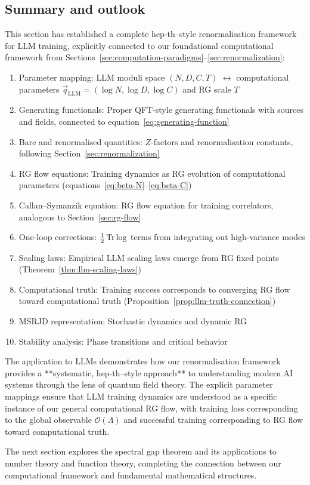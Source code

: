 \subsection{Summary and outlook}

This section has established a complete hep-th–style renormalisation framework for LLM training, explicitly connected to our foundational computational framework from Sections~\ref{sec:computation-paradigms}--\ref{sec:renormalization}:

\begin{enumerate}
\item Parameter mapping: LLM moduli space $(N,D,C,T)$ $\leftrightarrow$ computational parameters $\vec{q}_{\text{LLM}} = (\log N, \log D, \log C)$ and RG scale $T$
\item Generating functionals: Proper QFT-style generating functionals with sources and fields, connected to equation~\eqref{eq:generating-function}
\item Bare and renormalised quantities: $Z$-factors and renormalisation constants, following Section~\ref{sec:renormalization}
\item RG flow equations: Training dynamics as RG evolution of computational parameters (equations~\eqref{eq:beta-N}--\eqref{eq:beta-C})
\item Callan--Symanzik equation: RG flow equation for training correlators, analogous to Section~\ref{sec:rg-flow}
\item One-loop corrections: $\tfrac12\Tr\log$ terms from integrating out high-variance modes
\item Scaling laws: Empirical LLM scaling laws emerge from RG fixed points (Theorem~\ref{thm:llm-scaling-laws})
\item Computational truth: Training success corresponds to converging RG flow toward computational truth (Proposition~\ref{prop:llm-truth-connection})
\item MSRJD representation: Stochastic dynamics and dynamic RG
\item Stability analysis: Phase transitions and critical behavior
\end{enumerate}

The application to LLMs demonstrates how our renormalisation framework provides a **systematic, hep-th–style approach** to understanding modern AI systems through the lens of quantum field theory. The explicit parameter mappings ensure that LLM training dynamics are understood as a specific instance of our general computational RG flow, with training loss corresponding to the global observable $\mathcal{O}(\Lambda)$ and successful training corresponding to RG flow toward computational truth.

The next section explores the spectral gap theorem and its applications to number theory and function theory, completing the connection between our computational framework and fundamental mathematical structures.
